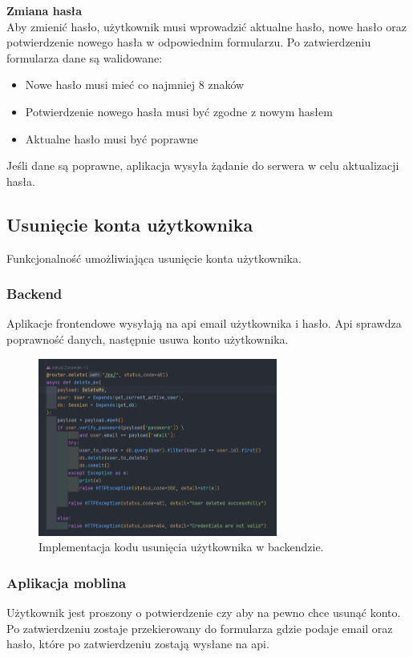 \textbf{Zmiana hasła}\\
Aby zmienić hasło, użytkownik musi wprowadzić aktualne hasło, nowe hasło oraz potwierdzenie nowego hasła w odpowiednim formularzu. Po zatwierdzeniu formularza dane są walidowane:
\begin{itemize}
    \item Nowe hasło musi mieć co najmniej 8 znaków
    \item Potwierdzenie nowego hasła musi być zgodne z nowym hasłem
    \item Aktualne hasło musi być poprawne
\end{itemize}
Jeśli dane są poprawne, aplikacja wysyła żądanie do serwera w celu aktualizacji hasła.

\subsection{Usunięcie konta użytkownika}
Funkcjonalność umożliwiająca usunięcie konta użytkownika.

\subsubsection{Backend}
Aplikacje frontendowe wysyłają na api email użytkownika i hasło. Api sprawdza poprawność danych, następnie usuwa konto użytkownika.

\begin{figure}[H]
    \centering
    \includegraphics[width=0.7\textwidth]{chapters/chapter_8/screens/delete_user_backend}
    \caption{Implementacja kodu usunięcia użytkownika w backendzie.}
    \label{img:delete_user_backend}
\end{figure}

\subsubsection{Aplikacja moblina}
Użytkownik jest proszony o potwierdzenie czy aby na pewno chce usunąć konto. Po zatwierdzeniu zostaje przekierowany do formularza gdzie podaje email oraz hasło, które po zatwierdzeniu zostają wysłane na api.

